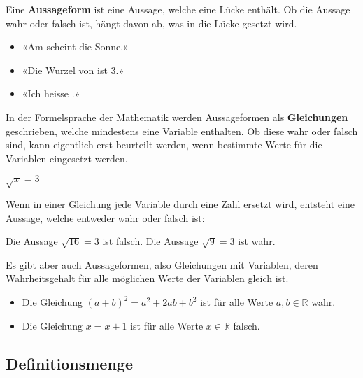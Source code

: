 Eine \textbf{Aussageform} ist eine Aussage, welche eine Lücke enthält. Ob die Aussage wahr oder falsch ist, hängt davon ab, was in die Lücke gesetzt wird.
\begin{example}
  \begin{itemize}[noitemsep]
    \item «Am \underline{\hspace{1cm}} scheint die Sonne.»
    \item «Die Wurzel von \underline{\hspace{1cm}} ist 3.»
    \item «Ich heisse \underline{\hspace{1cm}}.»
  \end{itemize}
\end{example}
In der Formelsprache der Mathematik werden Aussageformen als \textbf{Gleichungen} geschrieben, welche mindestens eine Variable enthalten. Ob diese wahr oder falsch sind, kann eigentlich erst beurteilt werden, wenn bestimmte Werte für die Variablen eingesetzt werden.
\begin{example}
  $\sqrt{x} = 3$
\end{example}
Wenn in einer Gleichung jede Variable durch eine Zahl ersetzt wird, entsteht eine Aussage, welche entweder wahr oder falsch ist:
\begin{example}
  Die Aussage $\sqrt{16} = 3$ ist falsch. Die Aussage $\sqrt{9} = 3$ ist wahr.
\end{example}
Es gibt aber auch Aussageformen, also Gleichungen mit Variablen, deren Wahrheitsgehalt für alle möglichen Werte der Variablen gleich ist.
\begin{example}
  \begin{itemize}[noitemsep]
    \item Die Gleichung $(a+b)^2= a^2+2ab+b^2$ ist für alle Werte $a,b\in\mathbb{R}$ wahr.
    \item Die Gleichung $x=x+1$ ist für alle Werte $x\in\mathbb{R}$ falsch.
  \end{itemize}
\end{example}

\subsection{Definitionsmenge}

